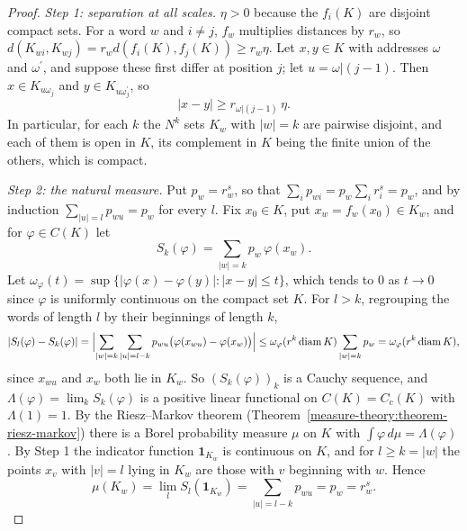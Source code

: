 \begin{proof}
\emph{Step 1: separation at all scales.} $\eta > 0$ because the $f_i(K)$ are disjoint compact sets. For a word $w$ and $i \neq j$, $f_w$ multiplies distances by $r_w$, so
$d(K_{wi}, K_{wj}) = r_wd(f_i(K), f_j(K)) \geq r_w\eta$. Let $x, y \in K$ with addresses $\omega$ and $\omega^{\prime}$, and suppose these first differ at position $j$; let $u = \omega|(j - 1)$. Then
$x \in K_{u\omega_j}$ and $y \in K_{u\omega^{\prime}_j}$, so
\begin{equation}\label{measure-theory:equation-separation}
|x - y| \geq r_{\omega|(j - 1)}\,\eta .
\end{equation}
In particular, for each $k$ the $N^k$ sets $K_w$ with $|w| = k$ are pairwise disjoint, and each of them is open in $K$, its complement in $K$ being the finite union of the others, which is compact.

\emph{Step 2: the natural measure.} Put $p_w = r_w^s$, so that $\sum_ip_{wi} = p_w\sum_ir_i^s = p_w$, and by induction $\sum_{|u| = l}p_{wu} = p_w$ for every $l$. Fix $x_0 \in K$, put
$x_w = f_w(x_0) \in K_w$, and for $\varphi \in C(K)$ let
\[
S_k(\varphi) = \sum_{|w| = k}p_w\,\varphi(x_w) .
\]
Let $\omega_\varphi(t) = \sup\{|\varphi(x) - \varphi(y)| : |x - y| \leq t\}$, which tends to $0$ as $t \to 0$ since $\varphi$ is uniformly continuous on the compact set $K$. For $l > k$, regrouping the words of
length $l$ by their beginnings of length $k$,
\[
|S_l(\varphi) - S_k(\varphi)| = \Bigl|\sum_{|w| = k}\sum_{|u| = l - k}p_{wu}\bigl(\varphi(x_{wu}) - \varphi(x_w)\bigr)\Bigr| \leq \omega_\varphi(r^k\operatorname{diam}K)\sum_{|w| = k}p_w = \omega_\varphi(r^k\operatorname{diam}K),
\]
since $x_{wu}$ and $x_w$ both lie in $K_w$. So $(S_k(\varphi))_k$ is a Cauchy sequence, and $\Lambda(\varphi) = \lim_kS_k(\varphi)$ is a positive linear functional on $C(K) = C_c(K)$ with $\Lambda(1) = 1$. By the
Riesz--Markov theorem (Theorem~\ref{measure-theory:theorem-riesz-markov}) there is a Borel probability measure $\mu$ on $K$ with $\int\varphi\,d\mu = \Lambda(\varphi)$. By Step 1 the indicator
function $\mathbf{1}_{K_w}$ is continuous on $K$, and for $l \geq k = |w|$ the points $x_v$ with $|v| = l$ lying in $K_w$ are those with $v$ beginning with $w$. Hence
\[
\mu(K_w) = \lim_lS_l(\mathbf{1}_{K_w}) = \sum_{|u| = l - k}p_{wu} = p_w = r_w^s .
\]


\end{proof}
